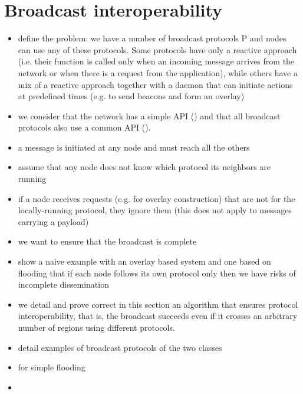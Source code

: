 
\section{Broadcast interoperability}






\begin{itemize}
	\item define the problem: we have a number of broadcast protocols P and nodes can use any of these protocols. Some protocols have only a reactive approach (i.e. their function is called only when an incoming message arrives from the network or when there is a request from the application), while others have a mix of a reactive approach together with a daemon that can initiate actions at predefined times (e.g. to send beacons and form an overlay)
	\item we consider that the network has a simple API () and that all broadcast protocols also use a common API ().
	\item a message is initiated at any node and must reach all the others
	\item assume that any node does not know which protocol its neighbors are running
	\item if a node receives requests (e.g. for overlay construction) that are not for the locally-running protocol, they ignore them (this does not apply to messages carrying a payload)
	\item we want to ensure that the broadcast is complete
	\item show a naive example with an overlay based system and one based on flooding that if each node follows its own protocol only then we have risks of incomplete dissemination
	\item we detail and prove correct in this section an algorithm that ensures protocol interoperability, that is, the broadcast succeeds even if it crosses an arbitrary number of regions using different protocols.
\end{itemize}

\begin{itemize}
	\item detail examples of broadcast protocols of the two classes
	\item {} for simple flooding
	\item {}
\end{itemize}

